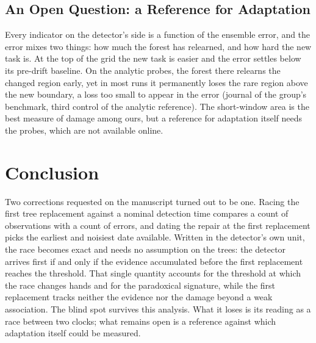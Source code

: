 \documentclass[10pt,conference]{IEEEtran}
\theoremstyle{definition}
\begin{document}
\subsection{An Open Question: a Reference for Adaptation}

Every indicator on the detector's side is a function of the ensemble error, and the error
mixes two things: how much the forest has relearned, and how hard the new task is. At the
top of the grid the new task is easier and the error settles below its pre-drift baseline.
On the analytic probes, the forest there relearns the changed region early, yet in most
runs it permanently loses the rare region above the new boundary, a loss too small to
appear in the error (journal of the group's benchmark, third control of the analytic
reference). The short-window area is the best
measure of damage among ours, but a reference for adaptation itself needs the probes,
which are not available online.

\section{Conclusion}
\label{sec:conclusion}

Two corrections requested on the manuscript turned out to be one. Racing the first tree
replacement against a nominal detection time compares a count of observations with a
count of errors, and dating the repair at the first replacement picks the earliest and
noisiest date available. Written in the detector's own unit, the race becomes exact and
needs no assumption on the trees: the detector arrives first if and only if the evidence
accumulated before the first replacement reaches the threshold. That single quantity
accounts for the threshold at which the race changes hands and for the paradoxical
signature, while the first replacement tracks neither the evidence nor the damage beyond
a weak association. The blind spot survives this analysis. What it loses is its reading
as a race between two clocks; what remains open is a reference against which adaptation
itself could be measured.
\end{document}
